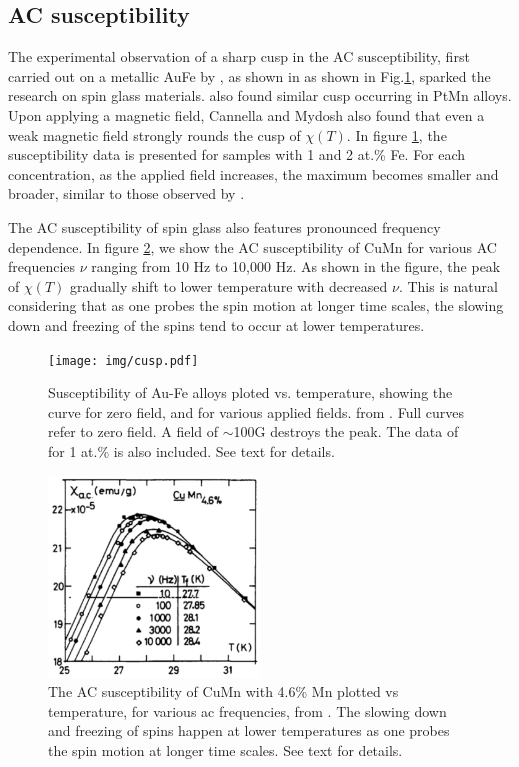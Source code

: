 \subsection{AC susceptibility}
The experimental observation of a sharp cusp in the AC susceptibility, first
carried out on a metallic AuFe by \citet{PhysRevB.6.4220}, as shown in as shown in Fig.\ref{fig:au-fe-cusp}, 
sparked the research on spin glass materials. 
\citet{THOLENCE1977875,:/content/aip/proceeding/aipcp/10.1063/1.30603,
:/content/aip/proceeding/aipcp/10.1063/1.30565} also found similar cusp occurring in PtMn alloys.
Upon applying a magnetic field, Cannella and Mydosh also found that even a weak
magnetic field strongly rounds the cusp of $\chi(T)$. 
In figure \ref{fig:au-fe-cusp}, the susceptibility data is presented for samples with
1 and 2 at.\% Fe. For each concentration, as the applied field increases, the maximum
becomes smaller and broader, similar to those observed by \citet{PhysRev.134.A676}.


The AC susceptibility of spin glass also features pronounced frequency dependence. 
In figure \ref{fig:ac-chi-freq}, we show the AC susceptibility of CuMn for various
AC frequencies $\nu$ ranging from 10 Hz to 10,000 Hz. As shown in the figure, the
peak of $\chi(T)$ gradually shift to lower temperature with decreased $\nu$.
This is natural considering that as one probes the spin motion at longer time scales,
the slowing down and freezing of the spins tend to occur at lower temperatures.

\begin{figure}
  \centering
  \texttt{[image: img/cusp.pdf]}
  \caption{\label{fig:au-fe-cusp}Susceptibility of Au-Fe alloys ploted vs. 
temperature, showing the curve for zero field, and for various applied fields. 
from \citet{PhysRevB.6.4220}. Full curves refer to zero field. A field of $\sim $100G 
destroys the peak. The data of \citet{PhysRev.134.A676} for 1 at.\% is also included.
See text for details.  
}
\end{figure}
\begin{figure}
  \centering
  \includegraphics[width=0.5\textwidth]{img/ac-chi-freq.png}
  \caption{\label{fig:ac-chi-freq} The AC susceptibility of CuMn with 4.6\% Mn 
plotted vs temperature, for various ac frequencies, from \citet{THOLENCE1980113}.
The slowing down and freezing of spins happen at lower temperatures as one 
probes the spin motion at longer time scales. See text for details. 
}
\end{figure}

